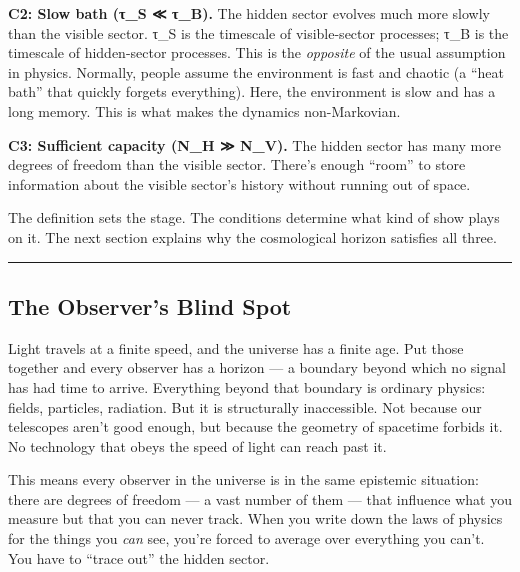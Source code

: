 \documentclass[
]{article}
\begin{document}
\textbf{C2: Slow bath (τ\_S ≪ τ\_B).} The hidden sector evolves much
more slowly than the visible sector. τ\_S is the timescale of
visible-sector processes; τ\_B is the timescale of hidden-sector
processes. This is the \emph{opposite} of the usual assumption in
physics. Normally, people assume the environment is fast and chaotic (a
``heat bath'' that quickly forgets everything). Here, the environment is
slow and has a long memory. This is what makes the dynamics
non-Markovian.

\textbf{C3: Sufficient capacity (N\_H ≫ N\_V).} The hidden sector has
many more degrees of freedom than the visible sector. There's enough
``room'' to store information about the visible sector's history without
running out of space.

The definition sets the stage. The conditions determine what kind of
show plays on it. The next section explains why the cosmological horizon
satisfies all three.

\begin{center}\rule{0.5\linewidth}{0.5pt}\end{center}

\hypertarget{the-observers-blind-spot}{%
\subsection{The Observer's Blind Spot}\label{the-observers-blind-spot}}

Light travels at a finite speed, and the universe has a finite age. Put
those together and every observer has a horizon --- a boundary beyond
which no signal has had time to arrive. Everything beyond that boundary
is ordinary physics: fields, particles, radiation. But it is
structurally inaccessible. Not because our telescopes aren't good
enough, but because the geometry of spacetime forbids it. No technology
that obeys the speed of light can reach past it.

This means every observer in the universe is in the same epistemic
situation: there are degrees of freedom --- a vast number of them ---
that influence what you measure but that you can never track. When you
write down the laws of physics for the things you \emph{can} see, you're
forced to average over everything you can't. You have to ``trace out''
the hidden sector.
\end{document}
